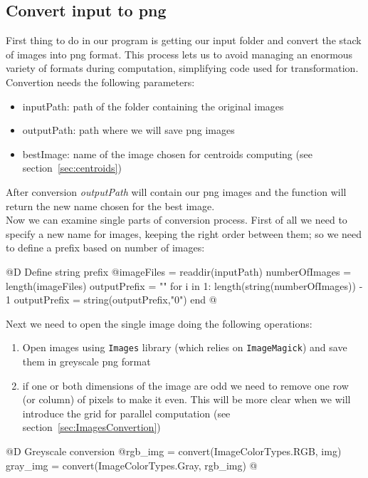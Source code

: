 \documentclass[11pt,oneside]{article}	%
\begin{document}
\subsection{Convert input to png}\label{sec:convertPNG}

First thing to do in our program is getting our input folder and convert the stack of images into png format. This process lets us to avoid managing an enormous variety of formats during computation, simplifying code used for transformation.\\

Convertion needs the following parameters:
\begin{itemize}
 \item inputPath: path of the folder containing the original images
 \item outputPath: path where we will save png images
 \item bestImage: name of the image chosen for centroids computing (see section~\ref{sec:centroids})
\end{itemize}

After conversion \textit{outputPath} will contain our png images and the function will return the new name chosen for the best image.\\

Now we can examine single parts of conversion process. First of all we need to specify a new name for images, keeping the right order between them; so we need to define a prefix based on number of images:

@D Define string prefix
@{imageFiles = readdir(inputPath)
numberOfImages = length(imageFiles)
outputPrefix = ""
for i in 1: length(string(numberOfImages)) - 1
  outputPrefix = string(outputPrefix,"0")
end @}
    
Next we need to open the single image doing the following operations:
\begin{enumerate}
 \item Open images using \texttt{Images} library (which relies on \texttt{ImageMagick}) and save them in greyscale png format 
 \item if one or both dimensions of the image are odd we need to remove one row (or column) of pixels to make it even. This will be more clear when we will introduce the grid for parallel computation (see section~\ref{sec:ImagesConvertion})
\end{enumerate}

@D Greyscale conversion
@{rgb_img = convert(Image{ColorTypes.RGB}, img)
gray_img = convert(Image{ColorTypes.Gray}, rgb_img) @}
    
\end{document}
